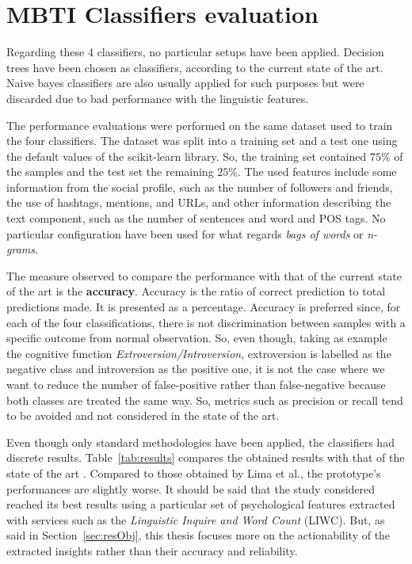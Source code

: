 \section{MBTI Classifiers evaluation}
Regarding these 4 classifiers, no particular setups have been applied.
Decision trees have been chosen as classifiers, according to the current state of the art.
Naive bayes classifiers are also usually applied for such purposes but were discarded due to bad performance with the linguistic features.

The performance evaluations were performed on the same dataset used to train the four classifiers.
The dataset was split into a training set and a test one using the default values of the scikit-learn library. So, the training set contained $75\%$ of the samples and the test set the remaining $25\%$.
The used features include some information from the social profile, such as the number of followers and friends, the use of hashtags, mentions, and URLs, and other information describing the text component, such as the number of sentences and word and POS tags.
No particular configuration have been used for what regards \textit{bags of words} or \textit{n-grams}.

The measure observed to compare the performance with that of the current state of the art is the \textbf{accuracy}.
Accuracy is the ratio of correct prediction to total predictions made. It is presented as a percentage.
Accuracy is preferred since, for each of the four classifications, there is not discrimination between samples with a specific outcome from normal observation.
So, even though, taking as example the cognitive function \textit{Extroversion/Introversion}, extroversion is labelled as the negative class and introversion as the positive one, it is not the case where we want to reduce the number of false-positive rather than false-negative because both classes are treated the same way.
So, metrics such as precision or recall tend to be avoided and not considered in the state of the art.

Even though only standard methodologies have been applied, the classifiers had discrete results. 
Table~\ref{tab:results} compares the obtained results with that of the state of the art \cite{lima2019tecla}.
Compared to those obtained by Lima et al., the prototype's performances are slightly worse. 
It should be said that the study considered reached its best results using a particular set of psychological features extracted with services such as the \textit{Linguistic Inquire and Word Count} (LIWC).
But, as said in Section~\ref{sec:resObj}, this thesis focuses more on the actionability of the extracted insights rather than their accuracy and reliability.

